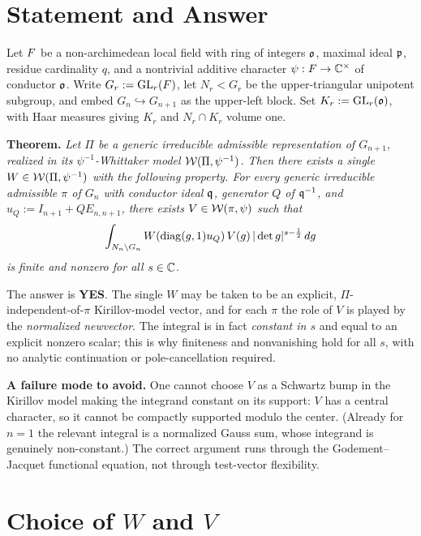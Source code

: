 \documentclass[11pt]{article}
\begin{document}
\section*{Statement and Answer}

Let $F$ be a non-archimedean local field with ring of integers $\mathfrak{o}$, maximal
ideal $\mathfrak{p}$, residue cardinality $q$, and a nontrivial additive character
$\psi:F\to\mathbb{C}^\times$ of conductor $\mathfrak{o}$. Write $G_r:=\mathrm{GL}_r(F)$, let $N_r<G_r$
be the upper-triangular unipotent subgroup, and embed $G_n\hookrightarrow
G_{n+1}$ as the upper-left block. Set $K_r:=\mathrm{GL}_r(\mathfrak{o})$, with Haar measures
giving $K_r$ and $N_r\cap K_r$ volume one.

\medskip
\noindent\textbf{Theorem.} \emph{Let $\Pi$ be a generic irreducible admissible
representation of $G_{n+1}$, realized in its $\psi^{-1}$-Whittaker model
$\mathcal{W}(\Pi,\psi^{-1})$. Then there exists a single $W\in\mathcal{W}(\Pi,\psi^{-1})$ with the
following property. For every generic irreducible admissible $\pi$ of $G_n$ with
conductor ideal $\mathfrak{q}$, generator $Q$ of $\mathfrak{q}^{-1}$, and
$u_Q:=I_{n+1}+QE_{n,n+1}$, there exists $V\in\mathcal{W}(\pi,\psi)$ such that}
\[
\int_{N_n\backslash G_n} W(\operatorname{diag}(g,1)u_Q)\,V(g)\,|\det g|^{s-\frac12}\,dg
\]
\emph{is finite and nonzero for all $s\in\mathbb{C}$.}

\medskip
\noindent The answer is \textbf{YES}. The single $W$ may be taken to be an
explicit, $\Pi$-independent-of-$\pi$ Kirillov-model vector, and for each $\pi$
the role of $V$ is played by the \emph{normalized newvector}. The integral is in
fact \emph{constant in $s$} and equal to an explicit nonzero scalar; this is why
finiteness and nonvanishing hold for all $s$, with no analytic continuation or
pole-cancellation required.

\medskip
\noindent\textbf{A failure mode to avoid.} One cannot choose $V$ as a
Schwartz bump in the Kirillov model making the integrand constant on its
support: $V$ has a central character, so it cannot be compactly supported modulo
the center. (Already for $n=1$ the relevant integral is a normalized Gauss sum,
whose integrand is genuinely non-constant.) The correct argument runs through the
Godement--Jacquet functional equation, not through test-vector flexibility.

\section*{Choice of $W$ and $V$}
\end{document}
